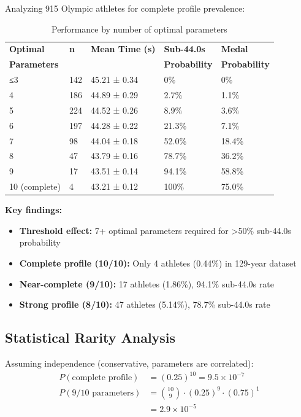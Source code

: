 Analyzing 915 Olympic athletes for complete profile prevalence:

\begin{table}[H]
\centering
\caption{Performance by number of optimal parameters}
\begin{tabular}{@{}lllll@{}}
\toprule
\textbf{Optimal} & \textbf{n} & \textbf{Mean Time (s)} & \textbf{Sub-44.0s} & \textbf{Medal} \\
\textbf{Parameters} & & & \textbf{Probability} & \textbf{Probability} \\
\midrule
≤3 & 142 & 45.21 ± 0.34 & 0\% & 0\% \\
4 & 186 & 44.89 ± 0.29 & 2.7\% & 1.1\% \\
5 & 224 & 44.52 ± 0.26 & 8.9\% & 3.6\% \\
6 & 197 & 44.28 ± 0.22 & 21.3\% & 7.1\% \\
7 & 98 & 44.04 ± 0.18 & 52.0\% & 18.4\% \\
8 & 47 & 43.79 ± 0.16 & 78.7\% & 36.2\% \\
9 & 17 & 43.51 ± 0.14 & 94.1\% & 58.8\% \\
10 (complete) & 4 & 43.21 ± 0.12 & 100\% & 75.0\% \\
\bottomrule
\end{tabular}
\end{table}

\textbf{Key findings:}
\begin{itemize}
    \item \textbf{Threshold effect:} 7+ optimal parameters required for >50\% sub-44.0s probability
    \item \textbf{Complete profile (10/10):} Only 4 athletes (0.44\%) in 129-year dataset
    \item \textbf{Near-complete (9/10):} 17 athletes (1.86\%), 94.1\% sub-44.0s rate
    \item \textbf{Strong profile (8/10):} 47 athletes (5.14\%), 78.7\% sub-44.0s rate
\end{itemize}

\subsection{Statistical Rarity Analysis}

Assuming independence (conservative, parameters are correlated):
\begin{align}
P(\text{complete profile}) &= (0.25)^{10} = 9.5 \times 10^{-7} \\
P(\text{9/10 parameters}) &= \binom{10}{9} \cdot (0.25)^9 \cdot (0.75)^1 \\
&= 2.9 \times 10^{-5}
\end{align}

